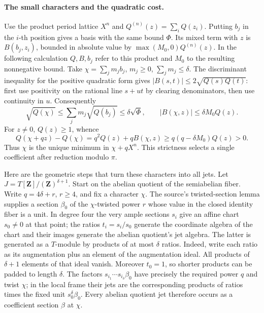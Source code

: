 \paragraph{The small characters and the quadratic cost.}
Use the product period lattice \(X^n\) and
\(Q^{(n)}(z)=\sum_i Q(z_i)\). Putting \(b_j\) in the \(i\)-th
position gives a basis with the same bound \(\Phi\). Its mixed term
with \(z\) is \(B(b_j,z_i)\), bounded in absolute value by
\(\max(M_0,0)Q^{(n)}(z)\). In the following calculation \(Q,B,b_j\)
refer to this product and \(M_0\) to the resulting nonnegative bound.
Take \(\chi=\sum_j m_j b_j\), \(m_j\ge0\), \(\sum_jm_j\le\delta\).
The discriminant inequality for the positive quadratic form gives
\(\lvert B(s,t)\rvert\le 2\sqrt{Q(s)Q(t)}\): first use positivity
on the rational line \(s+ut\) by clearing denominators, then use
continuity in \(u\). Consequently
\[
 \sqrt{Q(\chi)}\le\sum_j m_j\sqrt{Q(b_j)}\le\delta\sqrt{\Phi},
 \qquad |B(\chi,z)|\le\delta M_0 Q(z).
\]
For \(z\ne0\), \(Q(z)\ge1\), whence
\[
 Q(\chi+qz)-Q(\chi)=q^2Q(z)+qB(\chi,z)
       \ge q(q-\delta M_0)Q(z)>0.
\]
Thus \(\chi\) is the unique minimum in \(\chi+qX^n\). This
strictness selects a single coefficient after reduction modulo \(\pi\).

Here are the geometric steps that turn these characters into all
jets. Let \(J=T[\boldsymbol Z]/(\boldsymbol Z)^{\delta+1}\).
Start on the abelian quotient of the semiabelian fiber. Write
\(q=4\delta+r\), \(r\ge4\), and fix a character \(\chi\).
The source's twisted-section lemma supplies a section
\(\beta_0\) of the \(\chi\)-twisted power \(r\) whose value in the
closed identity fiber is a unit. In degree four the very ample
sections \(s_i\) give an affine chart \(s_0\ne0\) at that point;
the ratios \(t_i=s_i/s_0\) generate the coordinate algebra of the
chart and their images generate the abelian quotient's jet algebra.
The latter is generated as a \(T\)-module by products of at most
\(\delta\) ratios. Indeed, write each ratio as its augmentation plus
an element of the augmentation ideal. All products of \(\delta+1\)
elements of that ideal vanish. Moreover \(t_0=1\), so shorter
products can be padded to length \(\delta\).
The factors \(s_{i_1}\cdots s_{i_\delta}\beta_0\) have precisely
the required power \(q\) and twist \(\chi\); in the local frame
their jets are the corresponding products of ratios times the fixed
unit \(s_0^\delta\beta_0\). Every abelian quotient jet therefore
occurs as a coefficient section \(\beta\) at \(\chi\).

